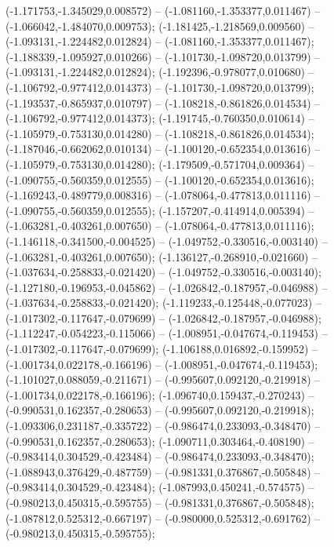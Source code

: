  (-1.171753,-1.345029,0.008572) -- (-1.081160,-1.353377,0.011467) -- (-1.066042,-1.484070,0.009753);
 (-1.181425,-1.218569,0.009560) -- (-1.093131,-1.224482,0.012824) -- (-1.081160,-1.353377,0.011467);
 (-1.188339,-1.095927,0.010266) -- (-1.101730,-1.098720,0.013799) -- (-1.093131,-1.224482,0.012824);
 (-1.192396,-0.978077,0.010680) -- (-1.106792,-0.977412,0.014373) -- (-1.101730,-1.098720,0.013799);
 (-1.193537,-0.865937,0.010797) -- (-1.108218,-0.861826,0.014534) -- (-1.106792,-0.977412,0.014373);
 (-1.191745,-0.760350,0.010614) -- (-1.105979,-0.753130,0.014280) -- (-1.108218,-0.861826,0.014534);
 (-1.187046,-0.662062,0.010134) -- (-1.100120,-0.652354,0.013616) -- (-1.105979,-0.753130,0.014280);
 (-1.179509,-0.571704,0.009364) -- (-1.090755,-0.560359,0.012555) -- (-1.100120,-0.652354,0.013616);
 (-1.169243,-0.489779,0.008316) -- (-1.078064,-0.477813,0.011116) -- (-1.090755,-0.560359,0.012555);
 (-1.157207,-0.414914,0.005394) -- (-1.063281,-0.403261,0.007650) -- (-1.078064,-0.477813,0.011116);
 (-1.146118,-0.341500,-0.004525) -- (-1.049752,-0.330516,-0.003140) -- (-1.063281,-0.403261,0.007650);
 (-1.136127,-0.268910,-0.021660) -- (-1.037634,-0.258833,-0.021420) -- (-1.049752,-0.330516,-0.003140);
 (-1.127180,-0.196953,-0.045862) -- (-1.026842,-0.187957,-0.046988) -- (-1.037634,-0.258833,-0.021420);
 (-1.119233,-0.125448,-0.077023) -- (-1.017302,-0.117647,-0.079699) -- (-1.026842,-0.187957,-0.046988);
 (-1.112247,-0.054223,-0.115066) -- (-1.008951,-0.047674,-0.119453) -- (-1.017302,-0.117647,-0.079699);
 (-1.106188,0.016892,-0.159952) -- (-1.001734,0.022178,-0.166196) -- (-1.008951,-0.047674,-0.119453);
 (-1.101027,0.088059,-0.211671) -- (-0.995607,0.092120,-0.219918) -- (-1.001734,0.022178,-0.166196);
 (-1.096740,0.159437,-0.270243) -- (-0.990531,0.162357,-0.280653) -- (-0.995607,0.092120,-0.219918);
 (-1.093306,0.231187,-0.335722) -- (-0.986474,0.233093,-0.348470) -- (-0.990531,0.162357,-0.280653);
 (-1.090711,0.303464,-0.408190) -- (-0.983414,0.304529,-0.423484) -- (-0.986474,0.233093,-0.348470);
 (-1.088943,0.376429,-0.487759) -- (-0.981331,0.376867,-0.505848) -- (-0.983414,0.304529,-0.423484);
 (-1.087993,0.450241,-0.574575) -- (-0.980213,0.450315,-0.595755) -- (-0.981331,0.376867,-0.505848);
 (-1.087812,0.525312,-0.667197) -- (-0.980000,0.525312,-0.691762) -- (-0.980213,0.450315,-0.595755);
